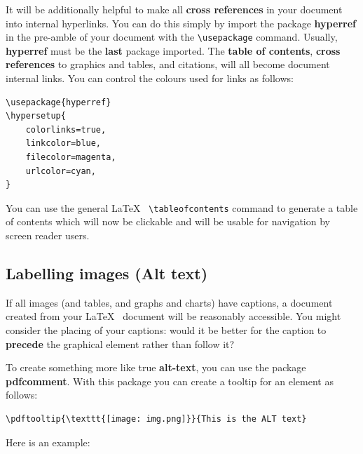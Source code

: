 \documentclass[]{article}
\begin{document}
It will be additionally helpful to make all \textbf{cross references} in
your document into internal hyperlinks. You can do this simply by import
the package \textbf{hyperref} in the pre-amble of your document with the
\texttt{\textbackslash{}usepackage} command. Usually, \textbf{hyperref}
must be the \textbf{last} package imported. The \textbf{table of
contents}, \textbf{cross references} to graphics and tables, and
citations, will all become document internal links. You can control the
colours used for links as follows:

\begin{verbatim}
\usepackage{hyperref}
\hypersetup{
    colorlinks=true,
    linkcolor=blue,
    filecolor=magenta,
    urlcolor=cyan,
}
\end{verbatim}

You can use the general \LaTeX~ \texttt{\textbackslash{}tableofcontents}
command to generate a table of contents which will now be clickable and
will be usable for navigation by screen reader users.

\hypertarget{labelling-images-alt-text}{%
\subsection{Labelling images (Alt
text)}\label{labelling-images-alt-text}}

If all images (and tables, and graphs and charts) have captions, a
document created from your \LaTeX~ document will be reasonably
accessible. You might consider the placing of your captions: would it be
better for the caption to \textbf{precede} the graphical element rather
than follow it?

To create something more like true \textbf{alt-text}, you can use the
package \textbf{pdfcomment}. With this package you can create a tooltip
for an element as follows:

\begin{verbatim}
\pdftooltip{\texttt{[image: img.png]}}{This is the ALT text}
\end{verbatim}

Here is an example:

\end{document}
